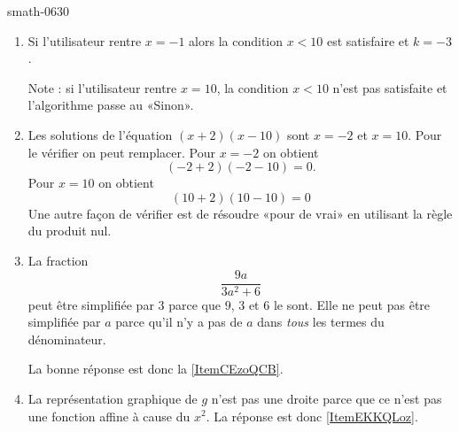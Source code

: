 
\begin{corrige}{smath-0630}

    \begin{enumerate}
        \item
            Si l'utilisateur rentre \( x=-1\) alors la condition \( x<10\) est satisfaire et \( k=-3\).

            Note : si l'utilisateur rentre \( x=10\), la condition \( x<10 \) n'est pas satisfaite et l'algorithme passe au «Sinon».
        \item
            Les solutions de l'équation \( (x+2)(x-10)\) sont \( x=-2\) et \( x=10\). Pour le vérifier on peut remplacer. Pour \( x=-2\) on obtient
            \begin{equation}
                (-2+2)(-2-10)=0.
            \end{equation}
            Pour \( x=10\) on obtient
            \begin{equation}
                (10+2)(10-10)=0
            \end{equation}
            Une autre façon de vérifier est de résoudre «pour de vrai» en utilisant la règle du produit nul.
        \item
            La fraction
            \begin{equation}
                \frac{ 9a }{ 3a^2+6 }
            \end{equation}
            peut être simplifiée par \( 3\) parce que \( 9\), \( 3\) et \( 6\) le sont. Elle ne peut pas être simplifiée par \( a\) parce qu'il n'y a pas de \( a\) dans \emph{tous} les termes du dénominateur.

            La bonne réponse est donc la \ref{ItemCEzoQCB}.
        \item
            La représentation graphique de \( g\) n'est pas une droite parce que ce n'est pas une fonction affine à cause du \( x^2\). La réponse est donc \ref{ItemEKKQLoz}.

    \end{enumerate}
    

\end{corrige}

